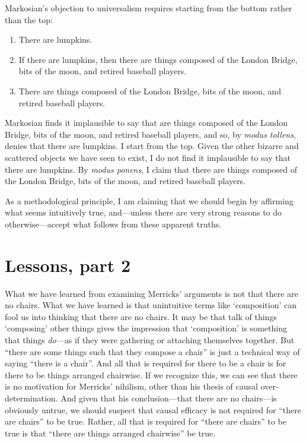 \documentclass[11pt]{article}
\begin{document}
\begin{spacing}{1.25}
Markosian's objection to universalism requires starting from the
bottom rather than the top:

\begin{enumerate}
  \item There are lumpkins.
  \item If there are lumpkins, then there are things composed of the
    London Bridge, bits of the moon, and retired baseball players.
  \item There are things composed of the London Bridge, bits of the
    moon, and retired baseball players.
\end{enumerate}

Markosian finds it implausible to say that are things composed of the
London Bridge, bits of the moon, and retired baseball players, and so,
by {\em modus tollens}, denies that there are lumpkins.  I start from
the top.  Given the other bizarre and scattered objects we have seen
to exist, I do not find it implausible to say that there are lumpkins.
By {\em modus ponens}, I claim that there are things composed of the
London Bridge, bits of the moon, and retired baseball players.

As a methodological principle, I am claiming that we should begin by
affirming what seems intuitively true, and---unless there are very
strong reasons to do otherwise---accept what follows from these
apparent truths.

\section{Lessons, part 2}
\label{lessons-m}
What we have learned from examining Merricks' arguments is not that
there are no chairs.  What we have learned is that unintuitive terms
like `composition' can fool us into thinking that there are no chairs.
It may be that talk of things `composing' other things gives the
impression that `composition' is something that things {\em do}---as
if they were gathering or attaching themselves together.  But ``there
are some things such that they compose a chair'' is just a technical
way of saying ``there is a chair''.  And all that is required for
there to be a chair is for there to be things arranged chairwise.  If
we recognize this, we can see that there is no motivation for
Merricks' nihilism, other than his thesis of causal
over-determination.  And given that his conclusion---that there are no
chairs---is obviously untrue, we should suspect that causal efficacy
is not required for ``there are chairs'' to be true.  Rather, all that
is required for ``there are chairs'' to be true is that ``there are
things arranged chairwise'' be true.


\end{spacing}
\end{document}

